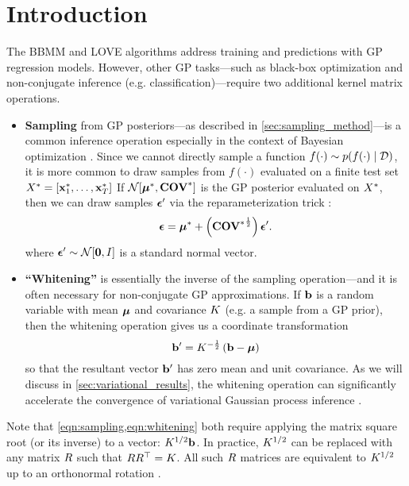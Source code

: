 \section{Introduction}

The BBMM and LOVE algorithms address training and predictions with GP regression models.
However, other GP tasks---such as black-box optimization and non-conjugate inference (e.g. classification)---require two additional kernel matrix operations.
\begin{itemize}
  \item {\bf Sampling} from GP posteriors---as described in \cref{sec:sampling_method}---is a common inference operation especially in the context of Bayesian optimization \cite{thompson1933likelihood,frazier2009knowledge,wang2017max}.
  Since we cannot directly sample a function $f(\cdot) \sim p(f(\cdot) \mid \mathcal D)$, it is more common to draw samples from  $f(\cdot)$ evaluated on a finite test set $X^* = [\mathbf{x}^*_1, \ldots, \mathbf{x}^*_T]$
  If $\normaldist{\bmeantest}{\Covtest}$ is the GP posterior evaluated on $X^*$, then we can draw samples $\boldsymbol{\epsilon}'$ via the reparameterization trick \cite{kingma2014auto,rezende2014stochastic}:
  \begin{equation}
    \boldsymbol{\epsilon} = \boldsymbol{\mu}^* + \left( {\textbf{COV}^*}^{\frac 1 2} \right) \boldsymbol{\epsilon}'.
    \label{eqn:sampling}
  \end{equation}
  where $\bepsilon' \sim \normaldist{\bzero}{\bI}$ is a standard normal vector.

  \item {\bf ``Whitening''} is essentially the inverse of the sampling operation---and it is often necessary for non-conjugate GP approximations.
  If $\mathbf{b}$ is a random variable with mean $\boldsymbol{\mu}$ and covariance $K$ (e.g. a sample from a GP prior), then the whitening operation gives us a coordinate transformation
  \begin{equation}
    \mathbf{b}' = K^{- \frac 1 2} \left( \mathbf{b} - \boldsymbol{\mu} \right)
    \label{eqn:whitening}
  \end{equation}
  so that the resultant vector $\mathbf{b}'$ has zero mean and unit covariance.
  As we will discuss in \cref{sec:variational_results}, the whitening operation can significantly accelerate the convergence of variational Gaussian process inference \cite{kuss2005assessing,hensman2013gaussian,matthews2017scalable}.
\end{itemize}
%
Note that \cref{eqn:sampling,eqn:whitening} both require applying the matrix square root (or its inverse) to a vector: $K^{1/2} \mathbf{b}$.
In practice, $K^{1/2}$ can be replaced with any matrix $R$ such that $R R^\top = K$.
All such $R$ matrices are equivalent to $K^{1/2}$ up to an orthonormal rotation \cite{golub2012matrix}.

